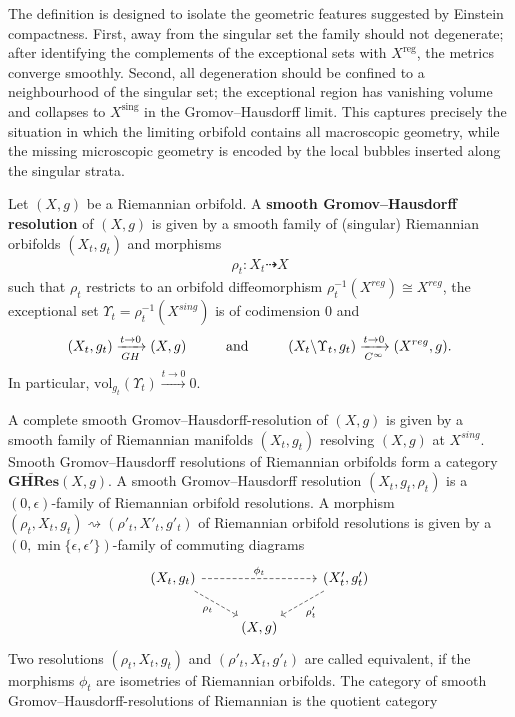 \documentclass[psamsfonts]{amsart}
\theoremstyle{plain}
\theoremstyle{definition}{
\newtheorem{defi}{Definition}[section]
\newtheorem{ass}{Assumption}
\newtheorem*{nota}{Notation}}
\theoremstyle{remark}{
\newtheorem{rem}{Remark}
\newtheorem{ex}{Example}}
\theoremstyle{plain}{
\newtheorem{thm}{Theorem}[section]
\newtheorem{lem}{Lemma}[section]
\newtheorem{cor}{Corollary}[section]
\newtheorem{prop}{Proposition}[section]
\newtheorem{con}{Conjecture}[section]}
\newcommand{\m}[1]{{\mathrm{#1}}}
\newcommand{\cat}[1]{\textbf{#1}}
\newcommand{\und}[1]{\hspace{#1}\text{and}\hspace{#1}}
\begin{document}
The definition is designed to isolate the geometric features suggested by Einstein compactness. First, away from the singular set the family should not degenerate; after identifying the complements of the exceptional sets with $X^{\mathrm{reg}}$, the metrics converge smoothly. Second, all degeneration should be confined to a neighbourhood of the singular set; the exceptional
region has vanishing volume and collapses to $X^{\mathrm{sing}}$ in the Gromov--Hausdorff limit. This captures precisely the situation in which the limiting orbifold contains all macroscopic geometry, while the missing microscopic geometry is encoded by the local bubbles inserted along the singular strata.
\begin{defi}
Let $(X,g)$ be a Riemannian orbifold. A \textbf{smooth Gromov--Hausdorff resolution} of $(X,g)$ is given by a smooth family of (singular) Riemannian orbifolds $(X_t,g_t)$ and morphisms
\begin{align*}
    \rho_t\colon X_t\dashrightarrow X
\end{align*}
such that $\rho_t$ restricts to an orbifold diffeomorphism $\rho_t^{-1}(X^{reg})\cong X^{reg}$, the exceptional set $\Upsilon_t=\rho_t^{-1}(X^{sing})$ is of codimension $0$ and 
\begin{align*}
    (X_t,g_t)\xrightarrow[GH]{t\to 0}(X,g)\und{1.0cm} (X_t\backslash \Upsilon_t,g_t)\xrightarrow[C^\infty]{t\to 0}(X^{reg},g).
\end{align*}
In particular, $\m{vol}_{g_t}(\Upsilon_t)\xrightarrow[]{t\to 0} 0$. 
\end{defi}
A complete smooth Gromov--Hausdorff-resolution of $(X,g)$ is given by a smooth family of Riemannian manifolds $(X_t,g_t)$ resolving $(X,g)$ at $X^{sing}$. Smooth Gromov--Hausdorff resolutions of Riemannian orbifolds form a category $\widetilde{\cat{GHRes}}(X,g)$. A smooth Gromov--Hausdorff resolution $(X_t,g_t,\rho_t)$ is a $(0,\epsilon)$-family of Riemannian orbifold resolutions. A morphism $(\rho_t,X_t,g_t)\rightsquigarrow(\rho'_t,X'_t,g'_t)$ of Riemannian orbifold resolutions is given by a $(0,\min\{\epsilon,\epsilon'\})$-family of commuting diagrams
\begin{equation*}
    \begin{tikzcd}
	{(X_t,g_t)}\arrow[rd,"{\rho_t}"', dashed] \arrow[rr,"{\phi_t}", dashed]&& {(X'_t,g'_t)}\arrow[dl,"{\rho'_t}", dashed] \\
	 & {(X,g)}
\end{tikzcd}
\end{equation*}
Two resolutions $(\rho_t,X_t,g_t)$ and $(\rho'_t,X_t,g'_t)$ are called equivalent, if the morphisms $\phi_t$ are isometries of Riemannian orbifolds. The category of smooth Gromov--Hausdorff-resolutions of Riemannian is the quotient category 
\end{document}
